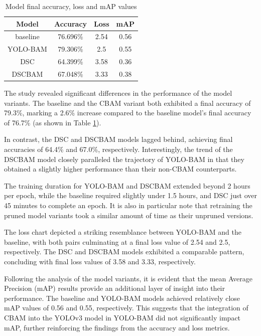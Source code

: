 \begin{table}[!htbp]
    \centering
    \caption{Model final accuracy, loss and mAP values}
    {
    \begin{tabular}{cccc}
        Model & Accuracy & Loss & mAP\\ \hline 
        baseline & 76.696\% & 2.54 & 0.56\\ 
        \hline 
        YOLO-BAM & 79.306\% & 2.5 & 0.55\\ 
        \hline 
        DSC & 64.399\% & 3.58 & 0.36\\ 
        \hline 
        DSCBAM & 67.048\% & 3.33 & 0.38\\
        \hline
    \end{tabular}
    }
    \label{tab:modelperfs}
\end{table}

The study revealed significant differences in the performance of the model variants. The baseline and the CBAM variant both exhibited a final accuracy of 79.3\%, marking a 2.6\% increase compared to the baseline model's final accuracy of 76.7\% (as shown in Table \ref{tab:modelperfs}). 

In contrast, the DSC and DSCBAM models lagged behind, achieving final accuracies of 64.4\% and 67.0\%, respectively. Interestingly, the trend of the DSCBAM model closely paralleled the trajectory of YOLO-BAM in that they obtained a slightly higher performance than their non-CBAM counterparts.

The training duration for YOLO-BAM and DSCBAM extended beyond 2 hours per epoch, while the baseline required slightly under 1.5 hours, and DSC just over 45 minutes to complete an epoch. It is also in particular note that retraining the pruned model variants took a similar amount of time as their unpruned versions.

The loss chart depicted a striking resemblance between YOLO-BAM and the baseline, with both pairs culminating at a final loss value of 2.54 and 2.5, respectively. The DSC and DSCBAM models exhibited a comparable pattern, concluding with final loss values of 3.58 and 3.33, respectively.

Following the analysis of the model variants, it is evident that the mean Average Precision (mAP) results provide an additional layer of insight into their performance. The baseline and YOLO-BAM models achieved relatively close mAP values of 0.56 and 0.55, respectively. This suggests that the integration of CBAM into the YOLOv3 model in YOLO-BAM did not significantly impact mAP, further reinforcing the findings from the accuracy and loss metrics.

